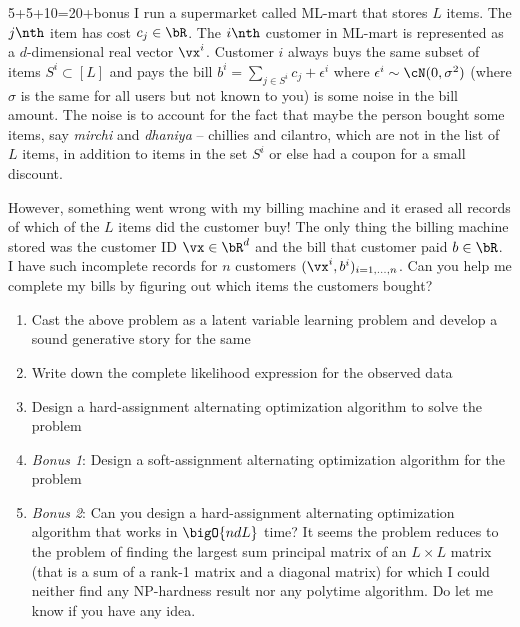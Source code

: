 \documentclass[a4paper,11pt]{article}
\begin{document}
\begin{mlproblem}{5+5+10=20+bonus}
I run a supermarket called ML-mart that stores $L$ items. The $j\nth$ item has cost $c_j \in \bR$. The $i\nth$ customer in ML-mart is represented as a $d$-dimensional real vector $\vx^i$. Customer $i$ always buys the same subset of items $S^i \subset [L]$ and pays the bill $b^i = \sum_{j \in S^i}c_j + \epsilon^i$ where $\epsilon^i \sim \cN(0,\sigma^2)$ (where $\sigma$ is the same for all users but not known to you) is some noise in the bill amount. The noise is to account for the fact that maybe the person bought some items, say \emph{mirchi} and \emph{dhaniya} -- chillies and cilantro, which are not in the list of $L$ items, in addition to items in the set $S^i$ or else had a coupon for a small discount.

However, something went wrong with my billing machine and it erased all records of which of the $L$ items did the customer buy! The only thing the billing machine stored was the customer ID $\vx \in \bR^d$ and the bill that customer paid $b \in \bR$. I have such incomplete records for $n$ customers $(\vx^i,b^i)_{i=1,\ldots,n}$. Can you help me complete my bills by figuring out which items the customers bought? 

\begin{enumerate}
	\item Cast the above problem as a latent variable learning problem and develop a sound generative story for the same
	\item Write down the complete likelihood expression for the observed data
	\item Design a hard-assignment alternating optimization algorithm to solve the problem
	\item \emph{Bonus 1}: Design a soft-assignment alternating optimization algorithm for the problem
	\item \emph{Bonus 2}: Can you design a hard-assignment alternating optimization algorithm that works in $\bigO{ndL}$ time? It seems the problem reduces to the problem of finding the largest sum principal matrix of an $L \times L$ matrix (that is a sum of a rank-1 matrix and a diagonal matrix) for which I could neither find any NP-hardness result nor any polytime algorithm. Do let me know if you have any idea.
\end{enumerate}


\end{mlproblem}
\end{document}
